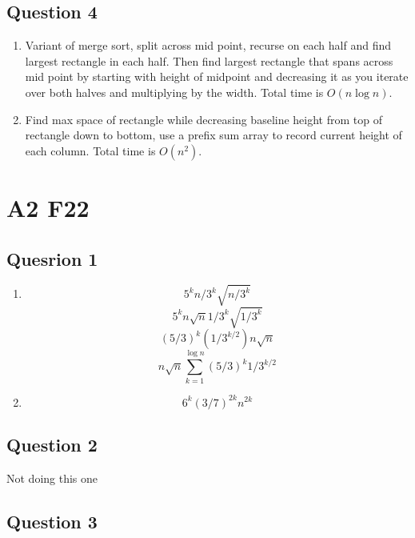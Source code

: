 \documentclass[11pt]{article}
\begin{document}
\subsection{Question 4}

\begin{enumerate}
    \item Variant of merge sort, split across mid point, recurse on each half and find largest rectangle in each half. Then find largest rectangle that spans across mid point by starting with height of midpoint and decreasing it as you iterate over both halves and multiplying by the width. Total time is $O(n \log n)$.
    \item Find max space of rectangle while decreasing baseline height from top of rectangle down to bottom, use a prefix sum array to record current height of each column. Total time is $O(n^2)$.
\end{enumerate}

\section{A2 F22}

\subsection{Quesrion 1}

\begin{enumerate}
    \item
          \[ 5^k n/3^k \sqrt{n/3^k} \]
          \[ 5^k n \sqrt{n} 1/3^k \sqrt{1/3^k} \]
          \[ (5/3)^k (1/3^{k/2}) n \sqrt{n} \]
          \[ n \sqrt{n} \sum_{k=1}^{\log n} (5/3)^k 1/3^{k/2} \]
    \item
          \[ 6^k (3/7)^{2k} n^{2k}  \]
\end{enumerate}

\subsection{Question 2} Not doing this one

\subsection{Question 3}
\end{document}
